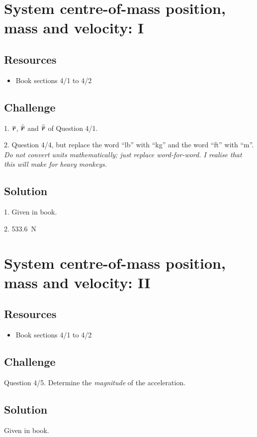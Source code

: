 \newpage
\section{System centre-of-mass position, mass and velocity: I}

\subsection*{Resources}
\begin{itemize}
    \item Book sections 4/1 to 4/2
\end{itemize}

\subsection*{Challenge}
1. $\bm{\overline{r}}$, $\dot{\bm{\overline{r}}}$ and $\ddot{\bm{\overline{r}}}$ of Question 4/1.

2. Question 4/4, but replace the word ``lb'' with ``kg'' and the word ``ft'' with ``m''. \emph{Do not convert units mathematically; just replace word-for-word. I realise that this will make for heavy monkeys.}

\subsection*{Solution}
1. Given in book.

2. \SI{533.6}{N}




\newpage
\section{System centre-of-mass position, mass and velocity: II}

\subsection*{Resources}
\begin{itemize}
    \item Book sections 4/1 to 4/2
\end{itemize}

\subsection*{Challenge}
Question 4/5. Determine the \emph{magnitude} of the acceleration.

\subsection*{Solution}
Given in book.




